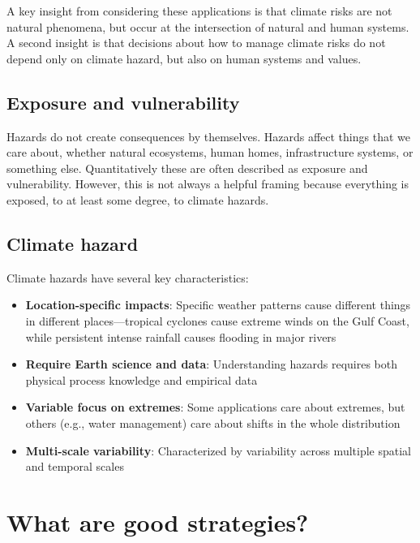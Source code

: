 \documentclass[
  letterpaper,
  DIV=11,
  numbers=noendperiod]{scrreprt}
\providecommand{\tightlist}{%
  \setlength{\itemsep}{0pt}\setlength{\parskip}{0pt}}
\begin{document}
A key insight from considering these applications is that climate risks
are not natural phenomena, but occur at the intersection of natural and
human systems. A second insight is that decisions about how to manage
climate risks do not depend only on climate hazard, but also on human
systems and values.

\subsection*{Exposure and
vulnerability}\label{exposure-and-vulnerability}

Hazards do not create consequences by themselves. Hazards affect things
that we care about, whether natural ecosystems, human homes,
infrastructure systems, or something else. Quantitatively these are
often described as exposure and vulnerability. However, this is not
always a helpful framing because everything is exposed, to at least some
degree, to climate hazards.

\subsection*{Climate hazard}\label{climate-hazard}

Climate hazards have several key characteristics:

\begin{itemize}
\tightlist
\item
  \textbf{Location-specific impacts}: Specific weather patterns cause
  different things in different places---tropical cyclones cause extreme
  winds on the Gulf Coast, while persistent intense rainfall causes
  flooding in major rivers
\item
  \textbf{Require Earth science and data}: Understanding hazards
  requires both physical process knowledge and empirical data
\item
  \textbf{Variable focus on extremes}: Some applications care about
  extremes, but others (e.g., water management) care about shifts in the
  whole distribution
\item
  \textbf{Multi-scale variability}: Characterized by variability across
  multiple spatial and temporal scales
\end{itemize}

\section*{What are good strategies?}\label{what-are-good-strategies}
\end{document}
